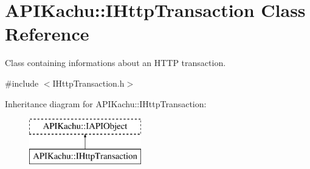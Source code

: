 \hypertarget{class_a_p_i_kachu_1_1_i_http_transaction}{}\section{A\+P\+I\+Kachu\+:\+:I\+Http\+Transaction Class Reference}
\label{class_a_p_i_kachu_1_1_i_http_transaction}


Class containing informations about an H\+T\+TP transaction.  




{\ttfamily \#include $<$I\+Http\+Transaction.\+h$>$}

Inheritance diagram for A\+P\+I\+Kachu\+:\+:I\+Http\+Transaction\+:\begin{figure}[H]
\begin{center}
\leavevmode
\includegraphics[height=2.000000cm]{class_a_p_i_kachu_1_1_i_http_transaction}
\end{center}
\end{figure}
